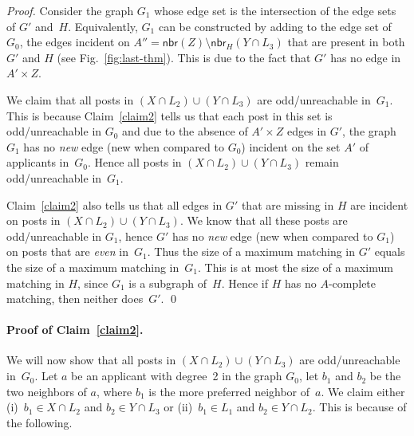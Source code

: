 \documentclass[11pt]{llncs}
\newcommand{\Nbr}{\mathsf{nbr}}
\begin{document}
\begin{proof}
Consider the graph $G_1$ whose edge set is the intersection of the edge sets of $G'$
and~$H$. Equivalently, $G_1$ can be constructed by adding to the edge set of $G_0$,
the edges incident on $A'' = \Nbr(Z)\setminus\Nbr_H(Y \cap L_3)$ that are present 
in both $G'$ and $H$ (see Fig.~\ref{fig:last-thm}).
This is due to the fact that $G'$ has no edge in $A' \times Z$.  


We claim that all posts in $(X \cap L_2) \cup (Y \cap L_3)$ are odd/unreachable in~$G_1$. This is because Claim~\ref{claim2} tells us that each post in this set is 
odd/unreachable in $G_0$ and due to the absence of $A' \times Z$ edges in $G'$, the graph 
$G_1$ has no {\em new} edge (new when compared to $G_0$) incident on the set $A'$ of 
applicants in~$G_0$. Hence all posts in $(X \cap L_2) \cup (Y \cap L_3)$ remain 
odd/unreachable in~$G_1$.

Claim~\ref{claim2} also tells us that all edges in $G'$ that are missing in $H$ are incident 
on posts in $(X \cap L_2) \cup (Y \cap L_3)$. We know that all these posts are 
odd/unreachable in $G_1$, hence $G'$ has no {\em new} edge (new when compared to $G_1$) on 
posts that are {\em even} in~$G_1$. Thus the size of a maximum matching in $G'$ equals the 
size of a maximum matching in~$G_1$. This is at most the size of a maximum matching in $H$, 
since $G_1$ is a subgraph of~$H$. 
Hence if $H$ has no $A$-complete matching, then neither does~$G'$. \qed
\end{proof}

\paragraph{Proof of Claim~\ref{claim2}.}
We will now show that all posts in $(X \cap L_2) \cup (Y \cap L_3)$ are odd/unreachable in~$G_0$.
Let $a$ be an applicant with degree~2 in the graph $G_0$, let $b_1$ and $b_2$ be the two 
neighbors of $a$, where $b_1$ is the more preferred neighbor of~$a$. We claim either 
(i)~$b_1 \in X \cap L_2$ and $b_2 \in Y \cap L_3$ or
(ii)~$b_1 \in L_1$ and $b_2 \in Y \cap L_2$.
This is because of the following.
\end{document}
